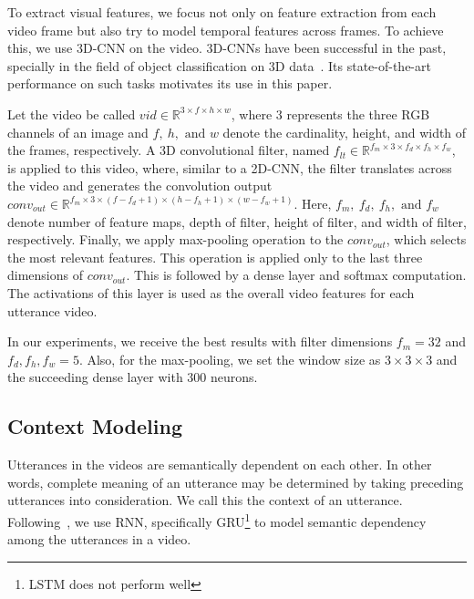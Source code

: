 \documentclass[review]{elsarticle}
\newcommand\?[1]{\hl{#1}}
\begin{document}
To extract visual features, we focus not only on feature extraction from each
video frame but also try to model temporal features across frames. To achieve
this, we use 3D-CNN on the video. 3D-CNNs have been successful in the past,
specially in the field of object classification on 3D data~\citep{ji20133d}. Its
state-of-the-art performance on such tasks motivates its use in this paper.

Let the video be called $vid \in \mathbb{R}^{3\times f\times h\times w}$, where
$3$ represents the three RGB channels of an image and $f,\ h,\text{ and }w$
denote the cardinality, height, and width of the frames, respectively. A 3D
convolutional filter, named $f_{lt}\in \mathbb{R}^{f_m\times 3\times f_d\times
f_h\times f_w}$, is applied to this video, where, similar to a 2D-CNN, the
filter translates across the video and generates the convolution output
$conv_{out} \in \mathbb{R}^{f_m\times 3\times (f-f_d+1)\times (h-f_h+1)\times
(w-f_w+1)}$. Here, $f_m,\ f_d,\ f_h,\text{ and }f_w$ denote number of feature
maps, depth of filter, height of filter, and width of filter,
respectively. Finally, we apply max-pooling operation to the $conv_{out}$, which
selects the most relevant features. This operation is applied only to the last
three dimensions of $conv_{out}$. This is followed by a dense layer and softmax
computation. The activations of this layer is used as the overall video features
for each utterance video.

In our experiments, we receive the best results with filter dimensions $f_m =
32$ and $f_d,f_h,f_w = 5$. Also, for the max-pooling, we set the window size as
$3\times 3\times 3$ and the succeeding dense layer with $300$ neurons.




\subsection{Context Modeling}
\label{sec:context}

Utterances in the videos are semantically dependent on each other. In other
words, complete meaning of an utterance may be determined by taking preceding
utterances into consideration. We call this the context of an utterance.
Following~\citet{porcon}, we use RNN, specifically GRU\footnote{LSTM does not
  perform well} to model semantic
dependency among the utterances in a video.
\end{document}
